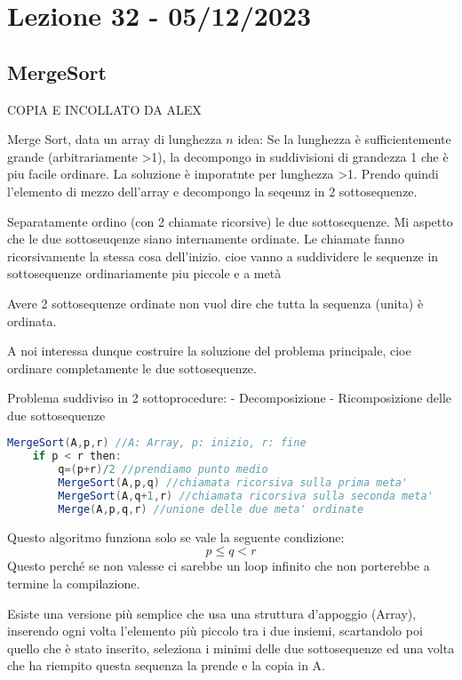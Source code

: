 \section{Lezione 32 - 05/12/2023}

\subsection{MergeSort}
COPIA E INCOLLATO DA ALEX

Merge Sort, data un array di lunghezza $n$
idea: Se la lunghezza è sufficientemente grande (arbitrariamente >1), la decompongo in suddivisioni di grandezza 1 che è piu facile ordinare. La soluzione è imporatnte per lunghezza >1.
Prendo quindi l'elemento di mezzo dell'array e decompongo la seqeunz in 2 sottosequenze.

Separatamente ordino (con 2 chiamate ricorsive) le due sottosequenze.
Mi aspetto che le due sottoseuqenze siano internamente ordinate.
Le chiamate fanno ricorsivamente la stessa cosa dell'inizio. cioe vanno a suddividere le sequenze in sottosequenze ordinariamente piu piccole e a metà


Avere 2 sottosequenze ordinate non vuol dire che tutta la sequenza (unita) è ordinata.

A noi interessa dunque costruire la soluzione del problema principale, cioe ordinare completamente le due sottosequenze.

Problema suddiviso in 2 sottoprocedure:
- Decomposizione
- Ricomposizione delle due sottosequenze

\begin{lstlisting}[language=Java]
MergeSort(A,p,r) //A: Array, p: inizio, r: fine
    if p < r then:
        q=(p+r)/2 //prendiamo punto medio
        MergeSort(A,p,q) //chiamata ricorsiva sulla prima meta'
        MergeSort(A,q+1,r) //chiamata ricorsiva sulla seconda meta'
        Merge(A,p,q,r) //unione delle due meta' ordinate
\end{lstlisting}
Questo algoritmo funziona solo se vale la seguente condizione:
$$p \le q < r$$
Questo perché se non valesse ci sarebbe un loop infinito che non porterebbe a termine la compilazione.\bigskip

Esiste una versione più semplice che usa una struttura d'appoggio (Array), inserendo ogni volta l'elemento più piccolo tra i due insiemi, scartandolo poi quello che è stato inserito, seleziona i minimi delle due sottosequenze ed una volta che ha riempito questa sequenza la prende e la copia in A.\bigskip


